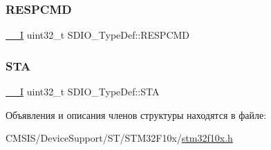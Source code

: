 \mbox{\label{struct_s_d_i_o___type_def_a9d881ed6c2fdecf77e872bcc6b404774}} 
\subsubsection{\texorpdfstring{RESPCMD}{RESPCMD}}
{\footnotesize\ttfamily \mbox{\hyperlink{group___c_m_s_i_s___c_m3__core__definitions_gaf63697ed9952cc71e1225efe205f6cd3}{\+\_\+\+\_\+I}} uint32\+\_\+t S\+D\+I\+O\+\_\+\+Type\+Def\+::\+R\+E\+S\+P\+C\+MD}

\mbox{\label{struct_s_d_i_o___type_def_a6b917b09c127e77bd3128bbe19a00499}} 
\subsubsection{\texorpdfstring{STA}{STA}}
{\footnotesize\ttfamily \mbox{\hyperlink{group___c_m_s_i_s___c_m3__core__definitions_gaf63697ed9952cc71e1225efe205f6cd3}{\+\_\+\+\_\+I}} uint32\+\_\+t S\+D\+I\+O\+\_\+\+Type\+Def\+::\+S\+TA}



Объявления и описания членов структуры находятся в файле\+:\begin{DoxyCompactItemize}
\item 
C\+M\+S\+I\+S/\+Device\+Support/\+S\+T/\+S\+T\+M32\+F10x/\mbox{\hyperlink{stm32f10x_8h}{stm32f10x.\+h}}\end{DoxyCompactItemize}
